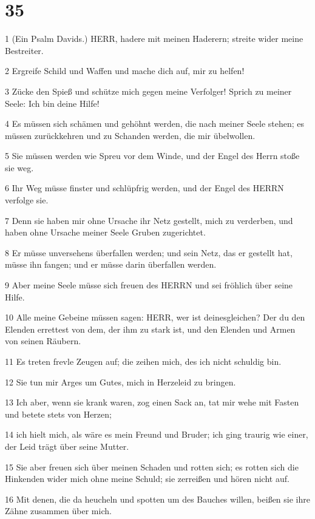 \chapter{35}

\par 1 (Ein Psalm Davids.) HERR, hadere mit meinen Haderern; streite wider meine Bestreiter.
\par 2 Ergreife Schild und Waffen und mache dich auf, mir zu helfen!
\par 3 Zücke den Spieß und schütze mich gegen meine Verfolger! Sprich zu meiner Seele: Ich bin deine Hilfe!
\par 4 Es müssen sich schämen und gehöhnt werden, die nach meiner Seele stehen; es müssen zurückkehren und zu Schanden werden, die mir übelwollen.
\par 5 Sie müssen werden wie Spreu vor dem Winde, und der Engel des Herrn stoße sie weg.
\par 6 Ihr Weg müsse finster und schlüpfrig werden, und der Engel des HERRN verfolge sie.
\par 7 Denn sie haben mir ohne Ursache ihr Netz gestellt, mich zu verderben, und haben ohne Ursache meiner Seele Gruben zugerichtet.
\par 8 Er müsse unversehens überfallen werden; und sein Netz, das er gestellt hat, müsse ihn fangen; und er müsse darin überfallen werden.
\par 9 Aber meine Seele müsse sich freuen des HERRN und sei fröhlich über seine Hilfe.
\par 10 Alle meine Gebeine müssen sagen: HERR, wer ist deinesgleichen? Der du den Elenden errettest von dem, der ihm zu stark ist, und den Elenden und Armen von seinen Räubern.
\par 11 Es treten frevle Zeugen auf; die zeihen mich, des ich nicht schuldig bin.
\par 12 Sie tun mir Arges um Gutes, mich in Herzeleid zu bringen.
\par 13 Ich aber, wenn sie krank waren, zog einen Sack an, tat mir wehe mit Fasten und betete stets von Herzen;
\par 14 ich hielt mich, als wäre es mein Freund und Bruder; ich ging traurig wie einer, der Leid trägt über seine Mutter.
\par 15 Sie aber freuen sich über meinen Schaden und rotten sich; es rotten sich die Hinkenden wider mich ohne meine Schuld; sie zerreißen und hören nicht auf.
\par 16 Mit denen, die da heucheln und spotten um des Bauches willen, beißen sie ihre Zähne zusammen über mich.
